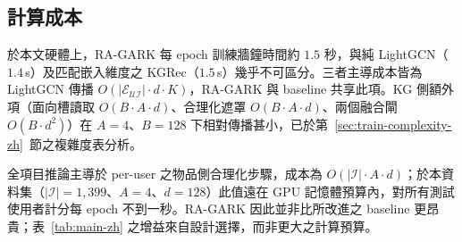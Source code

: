 \subsection{計算成本}
\label{sec:eval-cost-zh}

於本文硬體上，RA-GARK 每 epoch 訓練牆鐘時間約 $1.5$ 秒，與純 LightGCN（$1.4$\,s）及匹配嵌入維度之 KGRec（$1.5$\,s）幾乎不可區分。三者主導成本皆為 LightGCN 傳播 $O(|\mathcal{E}_{\mathcal{U}\mathcal{I}}| \cdot d \cdot K)$，RA-GARK 與 baseline 共享此項。KG 側額外項（面向槽讀取 $O(B \cdot A \cdot d)$、合理化遮罩 $O(B \cdot A \cdot d)$、兩個融合閘 $O(B \cdot d^2)$）在 $A = 4$、$B = 128$ 下相對傳播甚小，已於第~\ref{sec:train-complexity-zh}~節之複雜度表分析。

全項目推論主導於 per-user 之物品側合理化步驟，成本為 $O(|\mathcal{I}| \cdot A \cdot d)$；於本資料集（$|\mathcal{I}| = 1{,}399$、$A = 4$、$d = 128$）此值遠在 GPU 記憶體預算內，對所有測試使用者計分每 epoch 不到一秒。RA-GARK 因此並非比所改進之 baseline 更昂貴；表~\ref{tab:main-zh} 之增益來自設計選擇，而非更大之計算預算。
